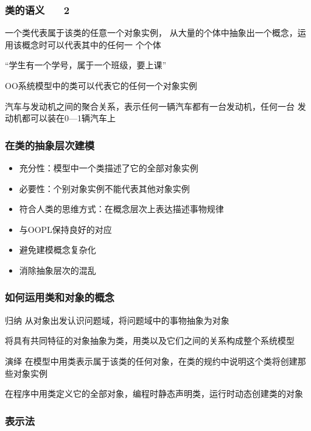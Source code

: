 \documentclass[compress]{beamer}
\begin{document}
  \begin{frame}
    \frametitle{类的语义 ~~ 2 }
    一个类代表属于该类的任意一个对象实例，
    从大量的个体中抽象出一个概念，运用该概念时可以代表其中的任何一
    个个体
    \begin{example}
      “学生有一个学号，属于一个班级，要上课” 
    \end{example}
    OO系统模型中的\alert{类}可以代表它的任何一个对象实例
    \begin{example}
    汽车与发动机之间的聚合关系，表示任何一辆汽车都有一台发动机，任何一台
    发动机都可以装在0—1辆汽车上
  \end{example}

  \end{frame}

  \begin{frame}
    \frametitle{在类的抽象层次建模}
    \begin{itemize}
      \item 充分性：模型中一个类描述了它的全部对象实例
      \item 必要性：个别对象实例不能代表其他对象实例
      \item 符合人类的思维方式：在概念层次上表达描述事物规律
      \item 与OOPL保持良好的对应
      \item 避免建模概念复杂化 
      \item 消除抽象层次的混乱
\end{itemize}
  \end{frame}

  \begin{frame}
    \frametitle{如何运用类和对象的概念}
    
    \begin{block}{归纳}
      从对象出发认识问题域，将问题域中的事物抽象为对象

      将具有共同特征的对象抽象为类，用类以及它们之间的关系构成整个系统模型
    \end{block}
    \begin{block}{演绎}
      在模型中用类表示属于该类的任何对象，在类的规约中说明这个类将创建那些对象实例

      在程序中用类定义它的全部对象，编程时静态声明类，运行时动态创建类的对象

    \end{block}
  \end{frame}

  \begin{frame}
    \frametitle{表示法}
    \centering{}
  \end{frame}
\end{document}
